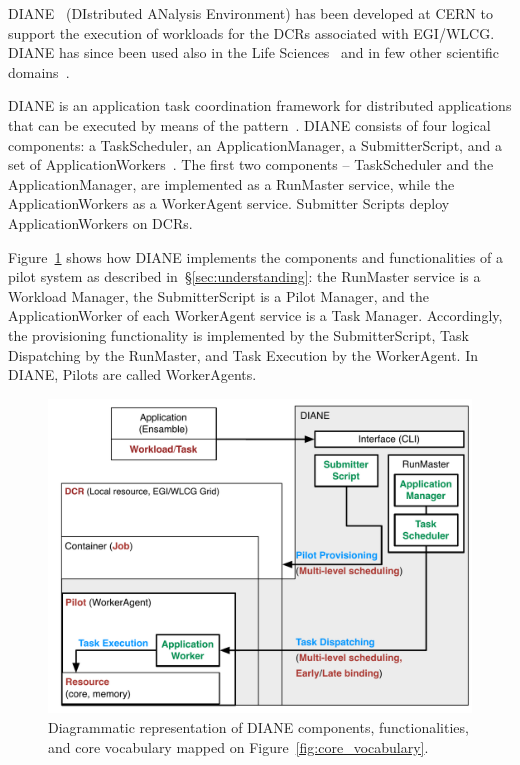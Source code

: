 \documentclass{sig-alternate}
\begin{document}
DIANE~\cite{moscicki2003diane} (DIstributed ANalysis Environment) has been
developed at CERN to support the execution of workloads for the DCRs associated
with EGI/WLCG. DIANE has since been used also in the Life
Sciences~\cite{moscicki2004biomedical,jacq2007virtual,moscicki2003} and in few
other scientific domains~\cite{bacu2011gswat,mantero2003simulation}.

DIANE is an application task coordination framework for distributed applications
that can be executed by means of the \MW pattern~\cite{moscicki2003diane}. DIANE
consists of four logical components: a TaskScheduler, an ApplicationManager, a
SubmitterScript, and a set of ApplicationWorkers~\cite{diane_url}. The first two
components -- TaskScheduler and the ApplicationManager, are implemented as a
RunMaster service, while the ApplicationWorkers as a WorkerAgent service.
Submitter Scripts deploy ApplicationWorkers on DCRs.


Figure~\ref{fig:diane_comparison} shows how DIANE implements the components and
functionalities of a pilot system as described in~\S\ref{sec:understanding}: the
RunMaster service is a Workload Manager, the SubmitterScript is a Pilot Manager,
and the ApplicationWorker of each WorkerAgent service is a Task Manager.
Accordingly, the \pilot provisioning functionality is implemented by the
SubmitterScript, Task Dispatching by the RunMaster, and Task Execution by the
WorkerAgent. In DIANE, Pilots are called WorkerAgents.

\begin{figure}[t]
    \centering
        \includegraphics[width=.48\textwidth]{figures/diane_comparison.pdf}
    \caption{Diagrammatic representation of DIANE components, functionalities,
    and core vocabulary mapped on Figure~\ref{fig:core_vocabulary}.}
    \label{fig:diane_comparison}
\end{figure}
\end{document}
